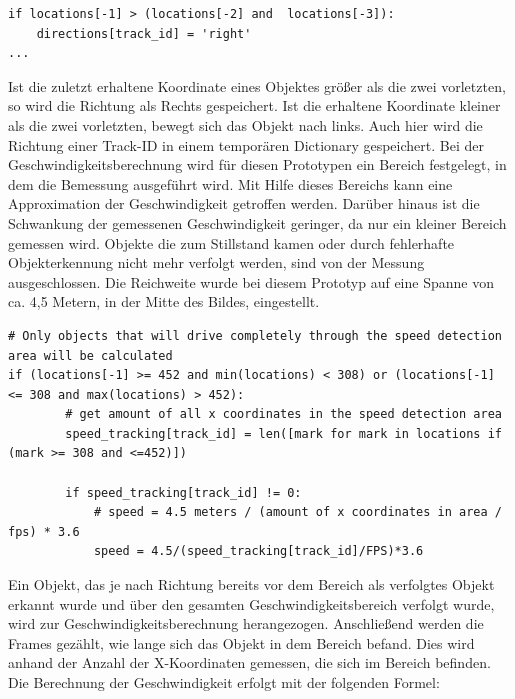 \vspace*{5mm}
\begin{lstlisting}[caption={Fahrtrichtungserkennung eines Objektes nach Rechts}, label={lst:directiondetection}]
if locations[-1] > (locations[-2] and  locations[-3]):
    directions[track_id] = 'right'
...
\end{lstlisting}

Ist die zuletzt erhaltene Koordinate eines Objektes größer als die zwei vorletzten, so wird die Richtung als Rechts gespeichert. Ist die erhaltene Koordinate kleiner als die zwei vorletzten, bewegt sich das Objekt nach links. Auch hier wird die Richtung einer Track-ID in einem temporären Dictionary gespeichert. Bei der Geschwindigkeitsberechnung wird für diesen Prototypen ein Bereich festgelegt, in dem die Bemessung ausgeführt wird. Mit Hilfe dieses Bereichs kann eine Approximation der Geschwindigkeit getroffen werden. Darüber hinaus ist die Schwankung der gemessenen Geschwindigkeit geringer, da nur ein kleiner Bereich gemessen wird. Objekte die zum Stillstand kamen oder durch fehlerhafte Objekterkennung nicht mehr verfolgt werden, sind von der Messung ausgeschlossen. Die Reichweite wurde bei diesem Prototyp auf eine Spanne von ca. 4,5 Metern, in der Mitte des Bildes, eingestellt. 

\newpage

\vspace*{5mm}
\begin{lstlisting}[caption={Berechnung der Geschwindigkeit}, label={lst:speedmeasurement}]
# Only objects that will drive completely through the speed detection area will be calculated
if (locations[-1] >= 452 and min(locations) < 308) or (locations[-1] <= 308 and max(locations) > 452):
        # get amount of all x coordinates in the speed detection area
        speed_tracking[track_id] = len([mark for mark in locations if (mark >= 308 and <=452)])
                                
        if speed_tracking[track_id] != 0:
            # speed = 4.5 meters / (amount of x coordinates in area / fps) * 3.6
            speed = 4.5/(speed_tracking[track_id]/FPS)*3.6
\end{lstlisting}

Ein Objekt, das je nach Richtung bereits vor dem Bereich als verfolgtes Objekt erkannt wurde und über den gesamten Geschwindigkeitsbereich verfolgt wurde, wird zur Geschwindigkeitsberechnung herangezogen. Anschließend werden die Frames gezählt, wie lange sich das Objekt in dem Bereich befand. Dies wird anhand der Anzahl der X-Koordinaten gemessen, die sich im Bereich befinden. Die Berechnung der Geschwindigkeit erfolgt mit der folgenden Formel:

